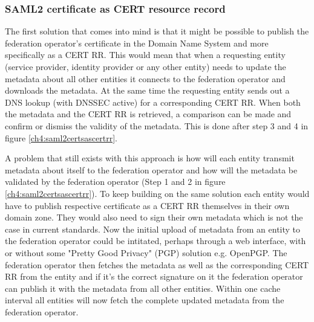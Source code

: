 \subsubsection{SAML2 certificate as CERT resource record}
\label{subsec:saml2-certificate-as-tlsa}
The first solution that comes into mind is that it might be possible to publish the federation operator's certificate in the Domain Name System and more specifically as a CERT RR\cite{rfc:4398}.
This would mean that when a requesting entity (service provider, identity provider or any other entity) needs to update the metadata about all other entities it connects to the federation operator and downloads the metadata.
At the same time the requesting entity sends out a DNS lookup (with DNSSEC active) for a corresponding CERT RR.
When both the metadata and the CERT RR is retrieved, a comparison can be made and confirm or dismiss the validity of the metadata.
This is done after step 3 and 4 in figure \ref{ch4:saml2certsascertrr}.

A problem that still exists with this approach is how will each entity transmit metadata about itself to the federation operator and how will the metadata be validated by the federation operator (Step 1 and 2 in figure \ref{ch4:saml2certsascertrr}).
To keep building on the same solution each entity would have to publish respective certificate as a CERT RR themselves in their own domain zone.
They would also need to sign their own metadata which is not the case in current standards. 
Now the initial upload of metadata from an entity to the federation operator could be intitated, perhaps through a web interface, with or without some "Pretty Good Privacy" (PGP) solution e.g. OpenPGP\cite{rfc:2440}.
The federation operator then fetches the metadata as well as the corresponding CERT RR from the entity and if it's the correct signature on it the federation operator can publish it with the metadata from all other entities.
Within one cache interval all entities will now fetch the complete updated metadata from the federation operator.

